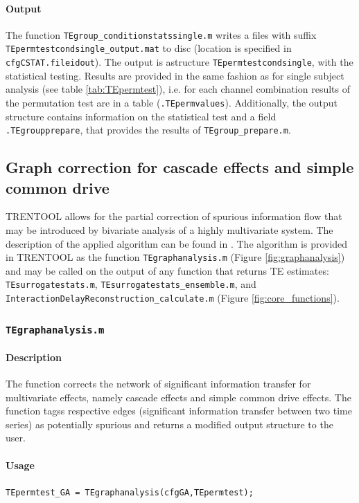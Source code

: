 \documentclass[a4paper,10pt]{article}
\begin{document}
\paragraph*{Output} The function \texttt{TEgroup\_conditionstatssingle.m} writes a files with suffix \texttt{TEpermtestcondsingle\_output.mat} to disc (location is specified in \texttt{cfgCSTAT.fileidout}). The output is astructure \texttt{TEpermtestcondsingle}, with the statistical testing. Results are provided in the same fashion as for single subject analysis (see table \ref{tab:TEpermtest}), i.e. for each channel combination results of the permutation test are in a table (\texttt{.TEpermvalues}). Additionally, the output structure contains information on the statistical test and a field \texttt{.TEgroupprepare}, that provides the results of \texttt{TEgroup\_prepare.m}.


\subsection{Graph correction for cascade effects and simple common drive} \label{sec:graphanalysis}

TRENTOOL allows for the partial correction of spurious information flow that may be introduced by bivariate analysis of a highly multivariate system. The description of the applied algorithm can be found in \cite{wollstadt2013}. The algorithm is provided in TRENTOOL as the function \verb&TEgraphanalysis.m& (Figure \ref{fig:graphanalysis}) and may be called on the output of any function that returns TE estimates: \verb&TEsurrogatestats.m&, \verb&TEsurrogatestats_ensemble.m&, and \verb&InteractionDelayReconstruction_calculate.m& (Figure \ref{fig:core_functions}). 


\subsubsection*{\texttt{TEgraphanalysis.m}}

\paragraph*{Description} The function corrects the network of significant information transfer for multivariate effects, namely cascade effects and simple common drive effects. The function tagss respective edges (significant information transfer between two time series) as potentially spurious and returns a modified output structure to the user.

\paragraph*{Usage} \verb&TEpermtest_GA = TEgraphanalysis(cfgGA,TEpermtest);&
\end{document}
